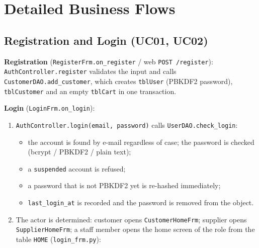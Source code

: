 \hypertarget{detailed-business-flows}{%
\section{Detailed Business Flows}\label{detailed-business-flows}}

\hypertarget{registration-and-login-uc01-uc02}{%
\subsection{Registration and Login (UC01,
UC02)}\label{registration-and-login-uc01-uc02}}

\textbf{Registration} (\texttt{RegisterFrm.\allowbreak{}on\_\allowbreak{}register} / web
\texttt{POST /\allowbreak{}register}): \texttt{AuthController.\allowbreak{}register} validates
the input and calls \texttt{CustomerDAO.\allowbreak{}add\_\allowbreak{}customer}, which creates
\texttt{tblUser} (PBKDF2 password), \texttt{tblCustomer} and an empty
\texttt{tblCart} in one transaction.

\textbf{Login} (\texttt{LoginFrm.\allowbreak{}on\_\allowbreak{}login}):

\begin{enumerate}
\def\labelenumi{\arabic{enumi}.}
\tightlist
\item
  \texttt{AuthController.\allowbreak{}login(\allowbreak{}email,\allowbreak{} password)} calls
  \texttt{UserDAO.\allowbreak{}check\_\allowbreak{}login}:

  \begin{itemize}
  \tightlist
  \item
    the account is found by e-mail regardless of case; the password is
    checked (bcrypt / PBKDF2 / plain text);
  \item
    a \texttt{suspended} account is refused;
  \item
    a password that is not PBKDF2 yet is re-hashed immediately;
  \item
    \texttt{last\_\allowbreak{}login\_\allowbreak{}at} is recorded and the password is removed
    from the object.
  \end{itemize}
\item
  The actor is determined: customer opens \texttt{CustomerHomeFrm};
  supplier opens \texttt{SupplierHomeFrm}; a staff member opens the home
  screen of the role from the table \texttt{HOME}
  (\texttt{login\_\allowbreak{}frm.\allowbreak{}py}):
\end{enumerate}

